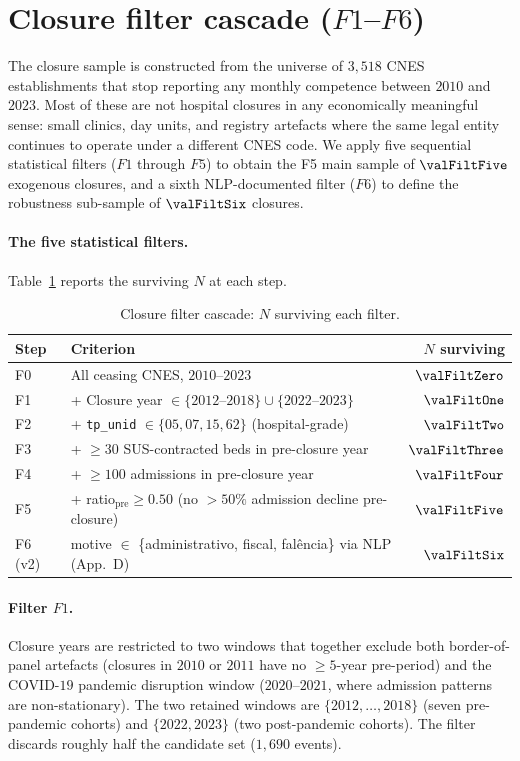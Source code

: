 \section{Closure filter cascade ($F1$--$F6$)}
\label{app:filter}

The closure sample is constructed from the universe of $3{,}518$ CNES
establishments that stop reporting any monthly competence between
$2010$ and $2023$. Most of these are not hospital closures in any
economically meaningful sense: small clinics, day units, and registry
artefacts where the same legal entity continues to operate under a
different CNES code. We apply five sequential statistical filters
($F1$ through $F5$) to obtain the F5 main sample of $\valFiltFive$ exogenous
closures, and a sixth NLP-documented filter ($F6$) to define the
robustness sub-sample of $\valFiltSix$ closures.

\paragraph{The five statistical filters.} Table~\ref{tab:filter} reports
the surviving $N$ at each step.

\begin{table}[h!]
\centering
\caption{Closure filter cascade: $N$ surviving each filter.}
\label{tab:filter}
\small
\begin{tabular}{llr}
\toprule
Step & Criterion & $N$ surviving \\
\midrule
F0  & All ceasing CNES, $2010$--$2023$ & $\valFiltZero$ \\
F1  & + Closure year $\in \{2012\text{--}2018\} \cup \{2022\text{--}2023\}$ & $\valFiltOne$ \\
F2  & + \texttt{tp\_unid} $\in \{05, 07, 15, 62\}$ (hospital-grade) & $\valFiltTwo$ \\
F3  & + $\geq 30$ SUS-contracted beds in pre-closure year & $\valFiltThree$ \\
F4  & + $\geq 100$ admissions in pre-closure year & $\valFiltFour$ \\
F5  & + ratio$_{\text{pre}} \geq 0.50$ (no $> 50\%$ admission decline pre-closure) & $\mathbf{\valFiltFive}$ \\
\midrule
F6 (v2) & motive $\in$ \{administrativo, fiscal, fal\^encia\} via NLP (App.~D) & $\mathbf{\valFiltSix}$ \\
\bottomrule
\end{tabular}
\end{table}

\paragraph{Filter $F1$.} Closure years are restricted to two windows that
together exclude both border-of-panel artefacts (closures in $2010$ or
$2011$ have no $\geq 5$-year pre-period) and the COVID-$19$ pandemic
disruption window ($2020$--$2021$, where admission patterns are
non-stationary). The two retained windows are $\{2012, \ldots, 2018\}$
(seven pre-pandemic cohorts) and $\{2022, 2023\}$ (two post-pandemic
cohorts). The filter discards roughly half the candidate set
($1{,}690$ events).

